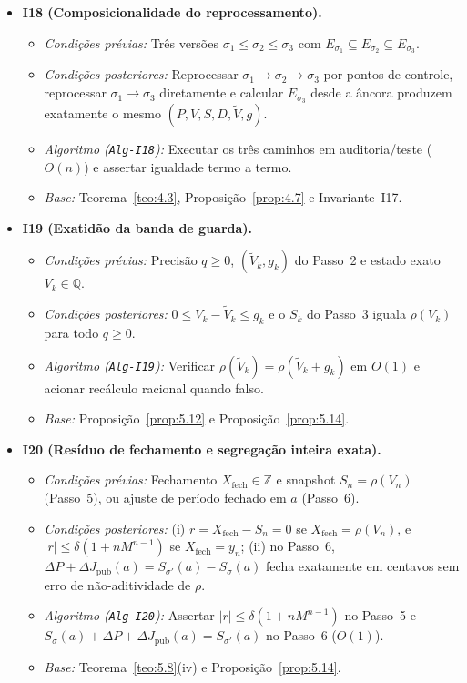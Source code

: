 \documentclass[11pt, a4paper]{article}
\theoremstyle{definition}
\theoremstyle{plain}
\theoremstyle{remark}
\begin{document}
\begin{itemize}
    \item \textbf{I18 (Composicionalidade do reprocessamento).}
    \begin{itemize}
        \item \emph{Condições prévias:} Três versões $\sigma_1 \le \sigma_2 \le \sigma_3$ com $E_{\sigma_1} \subseteq E_{\sigma_2} \subseteq E_{\sigma_3}$.
        \item \emph{Condições posteriores:} Reprocessar $\sigma_1 \to \sigma_2 \to \sigma_3$ por pontos de controle, reprocessar $\sigma_1 \to \sigma_3$ diretamente e calcular $E_{\sigma_3}$ desde a âncora produzem exatamente o mesmo $(P, V, S, D, \tilde{V}, g)$.
        \item \emph{Algoritmo (\texttt{Alg-I18}):} Executar os três caminhos em auditoria/teste ($O(n)$) e assertar igualdade termo a termo.
        \item \emph{Base:} Teorema~\ref{teo:4.3}, Proposição~\ref{prop:4.7} e Invariante~I17.
    \end{itemize}

    \item \textbf{I19 (Exatidão da banda de guarda).}
    \begin{itemize}
        \item \emph{Condições prévias:} Precisão $q \ge 0$, $(\tilde{V}_k, g_k)$ do Passo~2 e estado exato $V_k \in \mathbb{Q}$.
        \item \emph{Condições posteriores:} $0 \le V_k - \tilde{V}_k \le g_k$ e o $S_k$ do Passo~3 iguala $\rho(V_k)$ para todo $q \ge 0$.
        \item \emph{Algoritmo (\texttt{Alg-I19}):} Verificar $\rho(\tilde{V}_k) = \rho(\tilde{V}_k + g_k)$ em $O(1)$ e acionar recálculo racional quando falso.
        \item \emph{Base:} Proposição~\ref{prop:5.12} e Proposição~\ref{prop:5.14}.
    \end{itemize}

    \item \textbf{I20 (Resíduo de fechamento e segregação inteira exata).}
    \begin{itemize}
        \item \emph{Condições prévias:} Fechamento $X_{\text{fech}} \in \mathbb{Z}$ e snapshot $S_n = \rho(V_n)$ (Passo~5), ou ajuste de período fechado em $a$ (Passo~6).
        \item \emph{Condições posteriores:} (i) $r = X_{\text{fech}} - S_n = 0$ se $X_{\text{fech}} = \rho(V_n)$, e $|r| \le \delta(1 + n M^{n-1})$ se $X_{\text{fech}} = y_n$; (ii) no Passo~6, $\Delta P + \Delta J_{\text{pub}}(a) = S_{\sigma'}(a) - S_\sigma(a)$ fecha exatamente em centavos sem erro de não-aditividade de $\rho$.
        \item \emph{Algoritmo (\texttt{Alg-I20}):} Assertar $|r| \le \delta(1 + n M^{n-1})$ no Passo~5 e $S_\sigma(a) + \Delta P + \Delta J_{\text{pub}}(a) = S_{\sigma'}(a)$ no Passo~6 ($O(1)$).
        \item \emph{Base:} Teorema~\ref{teo:5.8}(iv) e Proposição~\ref{prop:5.14}.
    \end{itemize}
\end{itemize}
\end{document}
